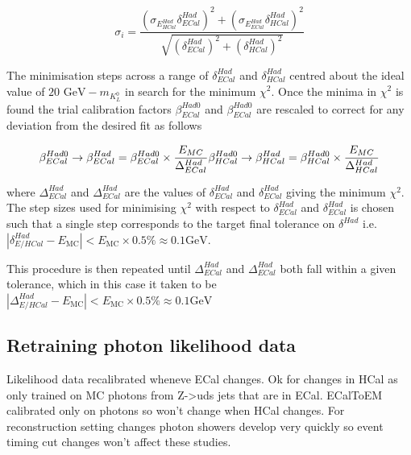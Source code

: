 \begin{equation}
\sigma_{i} = \frac{(\sigma_{E^{Had}_{HCal}}  \delta^{Had}_{ECal})^{2} + (\sigma_{E^{Had}_{ECal}} \delta^{Had}_{HCal})^{2}}{\sqrt{(\delta^{Had}_{ECal})^{2} + (\delta^{Had}_{HCal})^{2}}}
\label{equ:sigmaxicalc}
\end{equation}

The minimisation steps across a range of $\delta^{Had}_{ECal}$ and $\delta^{Had}_{HCal}$ centred about the ideal value of $20 \text { GeV} - m_{K^{0}_{L}}$ in search for the minimum $\chi^{2}$.  Once the minima in $\chi^{2}$ is found the trial calibration factors $\beta^{Had0}_{ECal}$ and $\beta^{Had0}_{ECal}$ are rescaled to correct for any deviation from the desired fit as follows

\begin{equation}
\beta^{Had0}_{ECal} \rightarrow \beta^{Had}_{ECal} = \beta^{Had0}_{ECal} \times \frac{E_{MC}}{\Delta^{Had}_{ECal}} \\
\beta^{Had0}_{HCal} \rightarrow \beta^{Had}_{HCal} = \beta^{Had0}_{HCal} \times \frac{E_{MC}}{\Delta^{Had}_{HCal}}
\end{equation}

where $\Delta^{Had}_{ECal}$ and $\Delta^{Had}_{ECal}$ are the values of $\delta^{Had}_{ECal}$ and $\delta^{Had}_{ECal}$ giving the minimum $\chi^{2}$.  The step sizes used for minimising $\chi^{2}$ with respect to $\delta^{Had}_{ECal}$ and $\delta^{Had}_{ECal}$ is chosen such that a single step corresponds to the target final tolerance on $\delta^{Had}$ i.e. $|\delta^{Had}_{E/HCal} - E_{\text{MC}}| < E_{\text{MC}} \times 0.5 \% \approx 0.1 \text{GeV}$.  

This procedure is then repeated until $\Delta^{Had}_{ECal}$ and $\Delta^{Had}_{ECal}$ both fall within a given tolerance, which in this case it taken to be $|\Delta^{Had}_{E/HCal} - E_{\text{MC}}| < E_{\text{MC}} \times 0.5 \% \approx 0.1 \text{GeV}$


\subsection{Retraining photon likelihood data}

Likelihood data recalibrated wheneve ECal changes.  Ok for changes in HCal as only trained on MC photons from Z->uds jets that are in ECal.  ECalToEM calibrated only on photons so won't change when HCal changes.  For reconstruction setting changes photon showers develop very quickly so event timing cut changes won't affect these studies.

